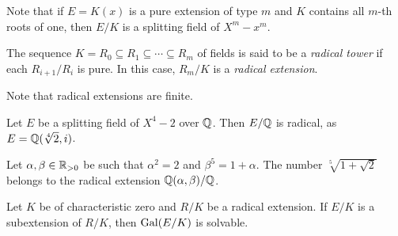 Note that if $E=K(x)$ is a pure extension of type $m$ and $K$ contains all
$m$-th roots of one, then $E/K$ is a splitting field of $X^m-x^m$. 

\begin{definition}
    The sequence $K=R_0\subseteq R_1\subseteq\cdots\subseteq R_m$ 
    of fields is said to be a \emph{radical tower} if 
    each $R_{i+1}/R_i$ is pure. In this case, $R_m/K$ is a \emph{radical extension}. 
\end{definition}

Note that radical extensions are finite. 

\begin{example}
    Let $E$ be a splitting field of $X^4-2$ over $\mathbb{Q}$. Then $E/\mathbb{Q}$ is radical, 
    as $E=\mathbb{Q}(\sqrt[4]{2},i)$. 
\end{example}

\begin{example}
    Let $\alpha,\beta\in\mathbb{R}_{>0}$ be such that $\alpha^2=2$ and 
    $\beta^5=1+\alpha$. 
    The number $\sqrt[5]{1+\sqrt{2}}$ belongs to the radical extension $\mathbb{Q}(\alpha,\beta)/\mathbb{Q}$. 
\end{example}

\begin{theorem}
\label{thm:by_radicals}
    Let $K$ be of characteristic zero and 
    $R/K$ be a radical extension. If $E/K$ is a subextension of $R/K$, 
    then $\operatorname{Gal}(E/K)$ is solvable. 
\end{theorem}


